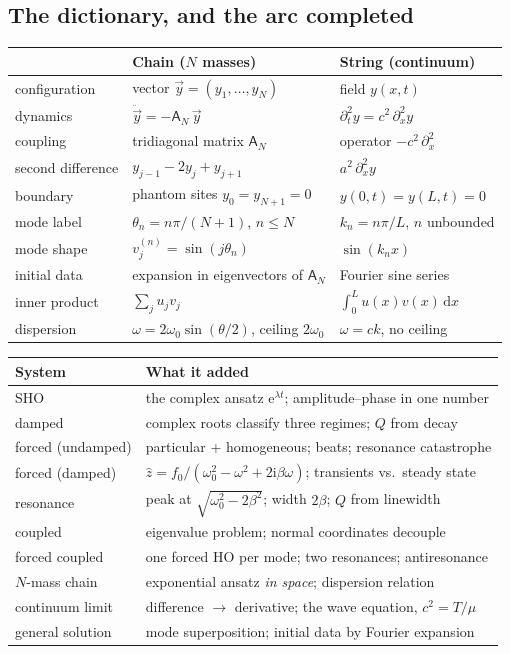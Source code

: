 \documentclass[11pt]{article}
\theoremstyle{plain}
\theoremstyle{definition}
\theoremstyle{remark}
\newcommand{\dd}{\mathrm{d}}
\newcommand{\ee}{\mathrm{e}}
\newcommand{\ii}{\mathrm{i}}
\newcommand{\mA}{\mathsf{A}}
\begin{document}
\subsection{The dictionary, and the arc completed}

\begin{center}
\begin{tabular}{lll}
\toprule
 & Chain ($N$ masses) & String (continuum) \\
\midrule
configuration & vector $\vec y = (y_1,\dots,y_N)$ & field $y(x,t)$ \\
dynamics & $\ddot{\vec y} = -\mA_N\, \vec y$ & $\partial_t^2 y = c^2\,\partial_x^2 y$ \\
coupling & tridiagonal matrix $\mA_N$ & operator $-c^2\,\partial_x^2$ \\
second difference & $y_{j-1}-2y_j+y_{j+1}$ & $a^2\,\partial_x^2 y$ \\
boundary & phantom sites $y_0 = y_{N+1} = 0$ & $y(0,t)=y(L,t)=0$ \\
mode label & $\theta_n = n\pi/(N+1)$, $n\le N$ & $k_n = n\pi/L$, $n$ unbounded \\
mode shape & $v_j^{(n)} = \sin(j\theta_n)$ & $\sin(k_n x)$ \\
initial data & expansion in eigenvectors of $\mA_N$ & Fourier sine series \\
inner product & $\sum_j u_j v_j$ & $\int_0^L u(x)v(x)\,\dd x$ \\
dispersion & $\omega = 2\omega_0\sin(\theta/2)$, ceiling $2\omega_0$ & $\omega = ck$, no ceiling \\
\bottomrule
\end{tabular}
\end{center}

\medskip

\begin{center}
\begin{tabular}{ll}
\toprule
System & What it added \\
\midrule
SHO & the complex ansatz $\ee^{\lambda t}$; amplitude--phase in one number \\
damped & complex roots classify three regimes; $Q$ from decay \\
forced (undamped) & particular + homogeneous; beats; resonance catastrophe \\
forced (damped) & $\hat z = f_0/(\omega_0^2-\omega^2+2\ii\beta\omega)$; transients vs.\ steady state \\
resonance & peak at $\sqrt{\omega_0^2 - 2\beta^2}$; width $2\beta$; $Q$ from linewidth \\
coupled & eigenvalue problem; normal coordinates decouple \\
forced coupled & one forced HO per mode; two resonances; antiresonance \\
$N$-mass chain & exponential ansatz \emph{in space}; dispersion relation \\
continuum limit & difference $\to$ derivative; the wave equation, $c^2 = T/\mu$ \\
general solution & mode superposition; initial data by Fourier expansion \\
\bottomrule
\end{tabular}
\end{center}
\end{document}
